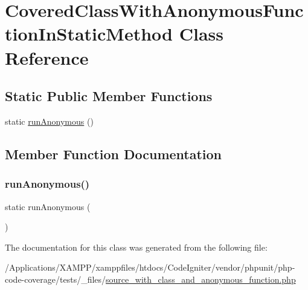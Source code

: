 \hypertarget{class_covered_class_with_anonymous_function_in_static_method}{}\section{Covered\+Class\+With\+Anonymous\+Function\+In\+Static\+Method Class Reference}
\label{class_covered_class_with_anonymous_function_in_static_method}
\subsection*{Static Public Member Functions}
\begin{DoxyCompactItemize}
\item 
static \mbox{\hyperlink{class_covered_class_with_anonymous_function_in_static_method_a39222245428e61412dd7c7c410a4ac80}{run\+Anonymous}} ()
\end{DoxyCompactItemize}


\subsection{Member Function Documentation}
\mbox{\label{class_covered_class_with_anonymous_function_in_static_method_a39222245428e61412dd7c7c410a4ac80}} 
\subsubsection{\texorpdfstring{run\+Anonymous()}{runAnonymous()}}
{\footnotesize\ttfamily static run\+Anonymous (\begin{DoxyParamCaption}{ }\end{DoxyParamCaption})\hspace{0.3cm}{\ttfamily [static]}}



The documentation for this class was generated from the following file\+:\begin{DoxyCompactItemize}
\item 
/\+Applications/\+X\+A\+M\+P\+P/xamppfiles/htdocs/\+Code\+Igniter/vendor/phpunit/php-\/code-\/coverage/tests/\+\_\+files/\mbox{\hyperlink{source__with__class__and__anonymous__function_8php}{source\+\_\+with\+\_\+class\+\_\+and\+\_\+anonymous\+\_\+function.\+php}}\end{DoxyCompactItemize}
